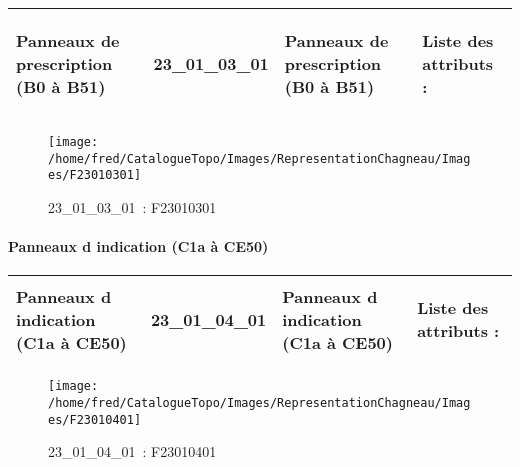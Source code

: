 \documentclass[12pt,titlepage,oneside]{book}
\begin{document}
\renewcommand{\arraystretch}{1.2}
\begin{supertabular}{|p{10cm}|c|p{13cm}|p{12cm}|}
 Panneaux de prescription (B0 à B51) & 23\_01\_03\_01 & Panneaux de prescription (B0 à B51) & Liste des attributs :
\begin{enumerate}
\end{enumerate}
\\
\hline
\end{supertabular}
\begin{figure}[h!]
  \hfill         %
  \begin{minipage}[t]{3cm}
    \begin{center}
      \texttt{[image: /home/fred/CatalogueTopo/Images/RepresentationChagneau/Images/F23010301]}
      \caption[~23\_01\_03\_01]{\small{23\_01\_03\_01~:} \tiny{F23010301}}\label{F23010301}
    \end{center}
  \end{minipage}
\end{figure}


\paragraph{Panneaux d indication (C1a à CE50)}
\noindent
\vspace{\baselineskip}

\renewcommand{\arraystretch}{1.2}
\begin{supertabular}{|p{10cm}|c|p{13cm}|p{12cm}|}
 Panneaux d indication (C1a à CE50) & 23\_01\_04\_01 & Panneaux d indication (C1a à CE50) & Liste des attributs :
\begin{enumerate}
\end{enumerate}
\\
\hline
\end{supertabular}
\begin{figure}[h!]
  \hfill         %
  \begin{minipage}[t]{3cm}
    \begin{center}
      \texttt{[image: /home/fred/CatalogueTopo/Images/RepresentationChagneau/Images/F23010401]}
      \caption[~23\_01\_04\_01]{\small{23\_01\_04\_01~:} \tiny{F23010401}}\label{F23010401}
    \end{center}
  \end{minipage}
\end{figure}
\end{document}
